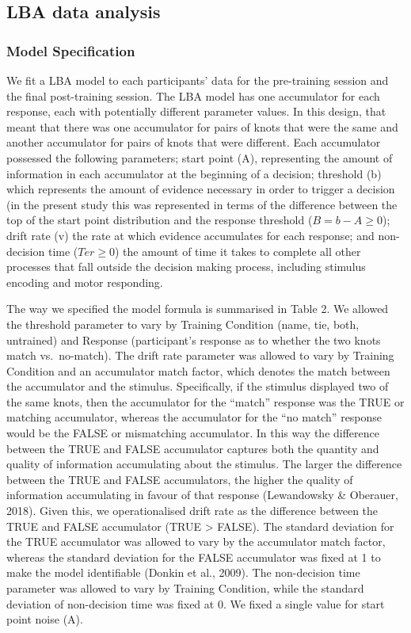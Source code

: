 \documentclass[
  english,
  man, donotrepeattitle,floatsintext]{apa6}
\begin{document}
\subsection{LBA data analysis}\label{lba-data-analysis}

\subsubsection{Model Specification}\label{model-specification}

We fit a LBA model to each participants' data for the pre-training session and the final post-training session. The LBA model has one accumulator for each response, each with potentially different parameter values. In this design, that meant that there was one accumulator for pairs of knots that were the same and another accumulator for pairs of knots that were different. Each accumulator possessed the following parameters; start point (A), representing the amount of information in each accumulator at the beginning of a decision; threshold (b) which represents the amount of evidence necessary in order to trigger a decision (in the present study this was represented in terms of the difference between the top of the start point distribution and the response threshold (\(B = b - A \ge 0\)); drift rate (v) the rate at which evidence accumulates for each response; and non-decision time (\(Ter \ge 0\)) the amount of time it takes to complete all other processes that fall outside the decision making process, including stimulus encoding and motor responding.

The way we specified the model formula is summarised in Table 2. We allowed the threshold parameter to vary by Training Condition (name, tie, both, untrained) and Response (participant's response as to whether the two knots match vs.~no-match). The drift rate parameter was allowed to vary by Training Condition and an accumulator match factor, which denotes the match between the accumulator and the stimulus. Specifically, if the stimulus displayed two of the same knots, then the accumulator for the ``match'' response was the TRUE or matching accumulator, whereas the accumulator for the ``no match'' response would be the FALSE or mismatching accumulator. In this way the difference between the TRUE and FALSE accumulator captures both the quantity and quality of information accumulating about the stimulus. The larger the difference between the TRUE and FALSE accumulators, the higher the quality of information accumulating in favour of that response (Lewandowsky \& Oberauer, 2018). Given this, we operationalised drift rate as the difference between the TRUE and FALSE accumulator (TRUE \textgreater{} FALSE). The standard deviation for the TRUE accumulator was allowed to vary by the accumulator match factor, whereas the standard deviation for the FALSE accumulator was fixed at 1 to make the model identifiable (Donkin et al., 2009). The non-decision time parameter was allowed to vary by Training Condition, while the standard deviation of non-decision time was fixed at 0. We fixed a single value for start point noise (A).
\end{document}
